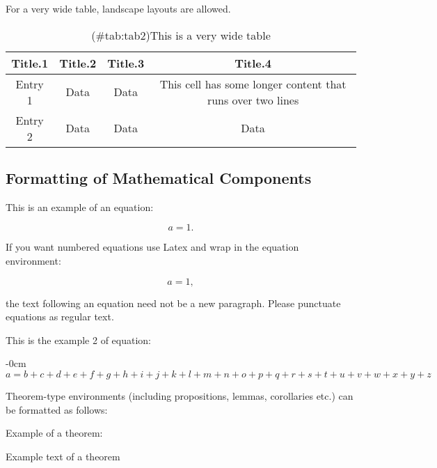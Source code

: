 \documentclass[
]{article}
\begin{document}
For a very wide table, landscape layouts are allowed.

\startlandscape

\begin{table}[H]

\caption{(\#tab:tab2)This is a very wide table}
\begin{tabular}[t]{cccc}
\toprule
Title.1 & Title.2 & Title.3 & Title.4\\
\midrule
Entry 1 & Data & Data & This cell has some longer content that runs over
                               two lines\\
Entry 2 & Data & Data & Data\\
\bottomrule
\end{tabular}
\end{table}

\finishlandscape

\hypertarget{formatting-of-mathematical-components}{%
\subsection{Formatting of Mathematical Components}\label{formatting-of-mathematical-components}}

This is an example of an equation:

\[
a = 1.
\]

If you want numbered equations use Latex and wrap in the equation environment:

\begin{equation}
a = 1,
\end{equation}

the text following an equation need not be a new paragraph. Please punctuate
equations as regular text.

This is the example 2 of equation:

\begin{adjustwidth}{-\extralength}{0cm}
\begin{equation}
a = b + c + d + e + f + g + h + i + j + k + l + m + n + o + p + q + r + s + t + 
u + v + w + x + y + z
\end{equation}
\end{adjustwidth}

Theorem-type environments (including propositions, lemmas, corollaries etc.)
can be formatted as follows:

Example of a theorem:

\begin{Theorem}
Example text of a theorem

\end{Theorem}
\end{document}
